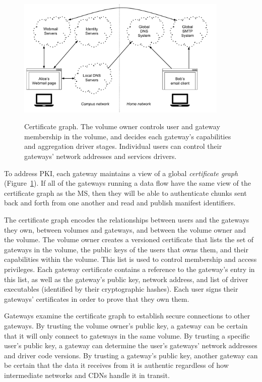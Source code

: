 \begin{figure}[h]
   \caption{Certificate graph.  The volume owner controls user and gateway
   membership in the volume, and decides each gateway's capabilities and
   aggregation driver stages.  Individual users can control their gateways'
   network addresses and services drivers.}
   \centering
   \includegraphics[width=0.9\textwidth,page=13]{figures/dissertation-figures}
   \label{fig:chap2-certificate-graph}
\end{figure}

To address PKI, each gateway maintains a view of a global \emph{certificate
graph} (Figure~\ref{fig:chap2-certificate-graph}).  If all
of the gateways running a data flow have the same view of the certificate graph
as the MS, then they will be able to authenticate chunks sent back and forth from one another
and read and publish manifest identifiers.

The certificate graph encodes the relationships between users and the gateways
they own, between volumes and gateways, and between the volume owner and the volume.
The volume owner creates a versioned certificate that lists the set of gateways
in the volume, the public keys of the users that owns them, and their capabilities within the
volume.  This list is used to control membership and access
privileges.  Each gateway certificate contains a reference to the gateway's
entry in this list, as well as the gateway's public key, network address, and list of
driver executables (identified by their cryptographic hashes).  Each user signs
their gateways' certificates in order to prove that they own them.

Gateways examine the certificate graph to establish secure connections to other
gateways.  By trusting the volume owner's public key, a gateway can be certain that it will
only connect to gateways in the same volume.  By trusting a specific user's
public key, a gateway can determine the user's gateways' network addresses and
driver code versions.  By trusting a gateway's public key, another gateway can be
certain that the data it receives from it is authentic regardless of how
intermediate networks and CDNs handle it in transit.

